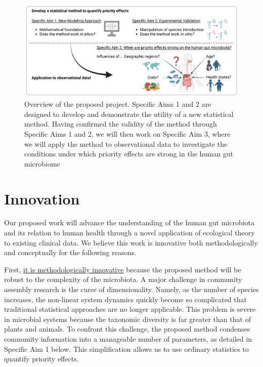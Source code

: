 \documentclass[12pt, class=article, crop=false]{standalone}
\begin{document}
\begin{figure}
    \flushleft
    \includegraphics[scale=0.65]{output/figure_overview.pdf}
    \caption{Overview of the proposed project. Specific Aims 1 and 2 are designed to develop and demonstrate the utility of a new statistical method. Having confirmed the validity of the method through Specific Aims 1 and 2, we will then work on Specific Aim 3, where we will apply the method to observational data to investigate the conditions under which priority effects are strong in the human gut microbiome}
    \label{fig:overview}
\end{figure}

\section{Innovation}
Our proposed work will advance the understanding of the human gut microbiota and its relation to human health through a novel application of ecological theory to existing clinical data.
We believe this work is innovative both methodologically and conceptually for the following reasons.

First, \ul{it is methodologically innovative} because the proposed method will be robust to the complexity of the microbiota.
A major challenge in community assembly research is the curse of dimensionality.
Namely, as the number of species increases, the non-linear system dynamics quickly become so complicated that traditional statistical approaches are no longer applicable.
This problem is severe in microbial systems because the taxonomic diversity is far greater than that of plants and animals.
To confront this challenge, the proposed method condenses community information into a manageable number of parameters, as detailed in Specific Aim 1 below. 
This simplification allows us to use ordinary statistics to quantify priority effects.
\end{document}
